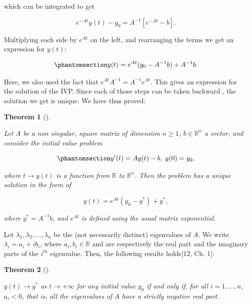 \documentclass[
  letterpaper,
]{report}
\theoremstyle{definition}
\theoremstyle{plain}
\newtheorem{theorem}{Theorem}[chapter]
\theoremstyle{definition}
\theoremstyle{remark}
\begin{document}
which can be integrated to get

\[
e^{-At}y(t) - y_0 = A^{-1}\left[e^{-At} - b\right].
\]

Multiplying each side by \(e^{At}\) on the left, and rearranging the
terms we get an expression for \(y(t)\):

\begin{equation}\phantomsection\label{eq-unique_solution_theoretical}{
y(t) = e^{At}(y_0 - A^{-1}b) + A^{-1}b.
}\end{equation}

Here, we also used the fact that \(e^{At}A^{-1} = A^{-1}e^{At}\). This
gives an expression for the solution of the IVP. Since each of those
steps can be taken backward , the solution we get is unique. We have
thus proved:

\begin{theorem}[]\protect\hypertarget{thm-ODEtheoretical}{}\label{thm-ODEtheoretical}

Let \(A\) be a non singular, square matrix of dimension \(n\geq 1\),
\(b\in\mathbb{R}^n\) a vector, and consider the initial value problem

\begin{equation}\phantomsection\label{eq-IVPth}{
y'(t) = Ay(t) - b, \; y(0) = y_0,
}\end{equation}

where \(t \rightarrow y(t)\) is a function from \(\mathbb{R}\) to
\(\mathbb{R}^n\). Then the problem has a unique solution in the form of

\[
y(t) = e^{At}(y_0 - y^*) + y^*,
\]

where \(y^* = A^{-1}b\), and \(e^{At}\) is defined using the usual
matrix exponential.

\end{theorem}

Let \(\lambda_1 , \lambda_2 , \dots , \lambda_n\) be the (not
necessarily distinct) eigenvalues of \(A\). We write
\(\lambda_i = a_i + ib_i\), where \(a_i,b_i \in \mathbb{R}\) and are
respectively the real part and the imaginary parts of the \(i^{th}\)
eigenvalue. Then, the following results holds{[}12, Ch. 1{]}:

\begin{theorem}[]\protect\hypertarget{thm-steadyState}{}\label{thm-steadyState}

\(y(t) \to y^*\) as \(t \to +\infty\) for any initial value \(y_0\) if
and only if, for all \(i = 1 , \dots , n\), \(a_i <0\), that is, all the
eigenvalues of \(A\) have a strictly negative real part.

\end{theorem}
\end{document}
